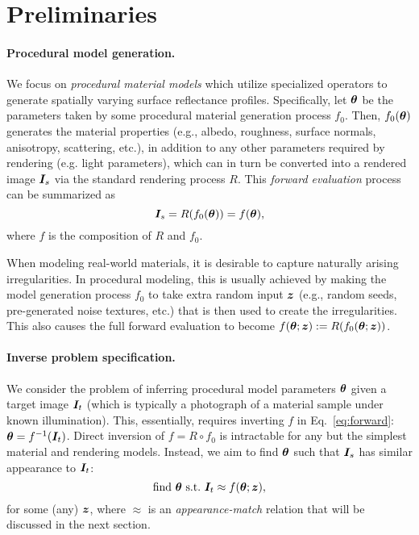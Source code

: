 \section{Preliminaries}
\label{sec:prelim}

\paragraph{Procedural model generation.}
We focus on \emph{procedural material models} which utilize specialized operators to generate spatially varying surface reflectance profiles.
Specifically, let $\bm{\theta}$ be the parameters taken by some procedural material generation process $f_0$.
Then, $f_0(\bm{\theta})$ generates the material properties (e.g., albedo, roughness, surface normals, anisotropy, scattering, etc.), in addition to any other parameters required by rendering (e.g. light parameters), which can in turn be converted into a rendered image $\bm{I}_s$ via the standard rendering process $R$.
This \emph{forward evaluation} process can be summarized as
%
\begin{equation}
	\label{eq:forward}
	\bm{I}_s = R(f_0(\bm{\theta})) = f(\bm{\theta}),
\end{equation}
%
where $f$ is the composition of $R$ and $f_0$.

When modeling real-world materials, it is desirable to capture naturally arising irregularities.
In procedural modeling, this is usually achieved by making the model generation process $f_0$ to take extra random input $\bm{z}$ (e.g., random seeds, pre-generated noise textures, etc.) that is then used to create the irregularities.
This also causes the full forward evaluation to become $f(\bm{\theta}; \bm{z}) := R(f_0(\bm{\theta}; \bm{z}))$.

\paragraph{Inverse problem specification.}
We consider the problem of inferring procedural model parameters $\bm{\theta}$ given a target image $\bm{I}_t$  (which is typically a photograph of a material sample under known illumination).
This, essentially, requires inverting $f$ in Eq.~\eqref{eq:forward}: $\bm{\theta} = f^{-1}(\bm{I}_t)$. Direct inversion of $f = R \circ f_0$ is intractable for any but the simplest material and rendering models.
Instead, we aim to find $\bm{\theta}$ such that $\bm{I}_s$ has similar appearance to $\bm{I}_t$:
%
\begin{equation}
	\label{eq:approx}
	\mbox{find} \ \bm{\theta} \ \mbox{s.t.} \ \bm{I}_t \approx f(\bm{\theta}; \bm{z}),
\end{equation}
%
for some (any) $\bm{z}$, where $\approx$ is an \emph{appearance-match} relation that will be discussed in the next section.


